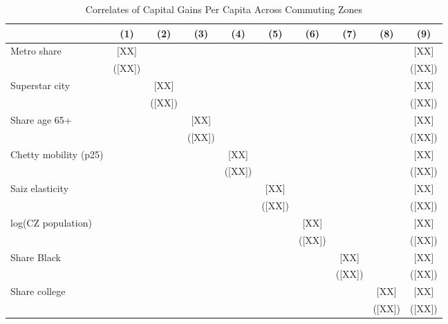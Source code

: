 \documentclass[12pt]{article}
\begin{document}
\begin{table}[H]
\centering
\caption{Correlates of Capital Gains Per Capita Across Commuting Zones}
\label{tab:kg_cz}
\small
\begin{tabular}{l*{9}{c}}
\toprule
 & (1) & (2) & (3) & (4) & (5) & (6) & (7) & (8) & (9) \\
\midrule
Metro share          & [XX]   &        &        &        &        &        &        &        & [XX]   \\
                     & ([XX]) &        &        &        &        &        &        &        & ([XX]) \\[3pt]
Superstar city       &        & [XX]   &        &        &        &        &        &        & [XX]   \\
                     &        & ([XX]) &        &        &        &        &        &        & ([XX]) \\[3pt]
Share age 65+        &        &        & [XX]   &        &        &        &        &        & [XX]   \\
                     &        &        & ([XX]) &        &        &        &        &        & ([XX]) \\[3pt]
Chetty mobility (p25)&        &        &        & [XX]   &        &        &        &        & [XX]   \\
                     &        &        &        & ([XX]) &        &        &        &        & ([XX]) \\[3pt]
Saiz elasticity      &        &        &        &        & [XX]   &        &        &        & [XX]   \\
                     &        &        &        &        & ([XX]) &        &        &        & ([XX]) \\[3pt]
log(CZ population)   &        &        &        &        &        & [XX]   &        &        & [XX]   \\
                     &        &        &        &        &        & ([XX]) &        &        & ([XX]) \\[3pt]
Share Black          &        &        &        &        &        &        & [XX]   &        & [XX]   \\
                     &        &        &        &        &        &        & ([XX]) &        & ([XX]) \\[3pt]
Share college        &        &        &        &        &        &        &        & [XX]   & [XX]   \\
                     &        &        &        &        &        &        &        & ([XX]) & ([XX]) \\[3pt]

\end{tabular}
\end{table}
\end{document}
